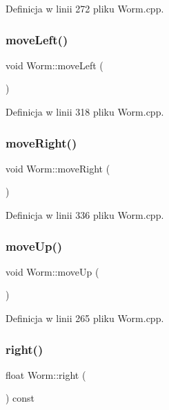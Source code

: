 Definicja w linii 272 pliku Worm.\+cpp.

\mbox{\label{class_worm_a93d02457a10bbbfc1d2028168419ecb8}} 
\subsubsection{\texorpdfstring{move\+Left()}{moveLeft()}}
{\footnotesize\ttfamily void Worm\+::move\+Left (\begin{DoxyParamCaption}{ }\end{DoxyParamCaption})}



Definicja w linii 318 pliku Worm.\+cpp.

\mbox{\label{class_worm_a6d4b33910c18b0e266e310d9b5512d75}} 
\subsubsection{\texorpdfstring{move\+Right()}{moveRight()}}
{\footnotesize\ttfamily void Worm\+::move\+Right (\begin{DoxyParamCaption}{ }\end{DoxyParamCaption})}



Definicja w linii 336 pliku Worm.\+cpp.

\mbox{\label{class_worm_ae2d842c005b7bc4b20ae8333ebc9c19c}} 
\subsubsection{\texorpdfstring{move\+Up()}{moveUp()}}
{\footnotesize\ttfamily void Worm\+::move\+Up (\begin{DoxyParamCaption}{ }\end{DoxyParamCaption})}



Definicja w linii 265 pliku Worm.\+cpp.

\mbox{\label{class_worm_a52905b36980b4aa37fe1b004df9edc0e}} 
\subsubsection{\texorpdfstring{right()}{right()}}
{\footnotesize\ttfamily float Worm\+::right (\begin{DoxyParamCaption}{ }\end{DoxyParamCaption}) const}



